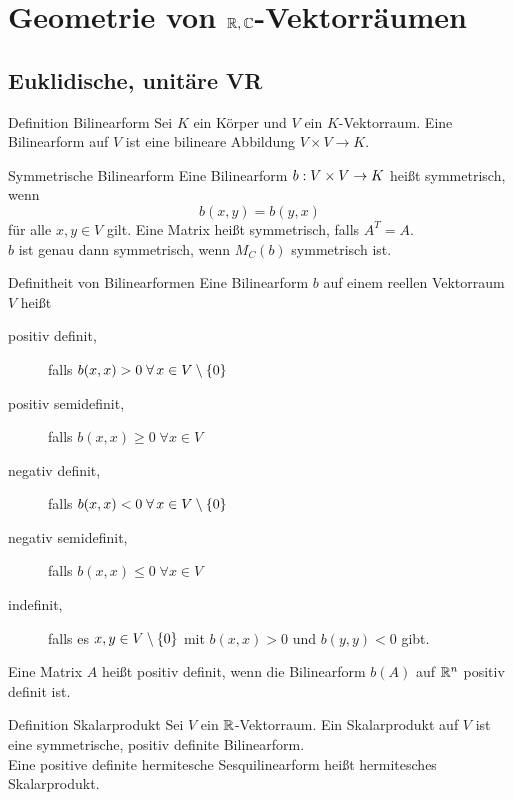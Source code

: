 \documentclass[main.tex]{subfiles}
\begin{document}
\section*{Geometrie von \(\mathbb{R}, \mathbb{C}\)-Vektorräumen}
\subsection*{Euklidische, unitäre VR}

\begin{karte}{Definition Bilinearform}
     Sei \(K\) ein Körper und \(V\) ein \(K\)-Vektorraum. Eine
     Bilinearform auf \(V\) ist eine bilineare Abbildung 
     \(V \times V \rightarrow K\).\\
\end{karte}

\begin{karte}{Symmetrische Bilinearform}
    Eine Bilinearform \(b : V\times V \rightarrow K\) heißt symmetrisch,
    wenn
    \[ b(x,y) = b(y,x) \]
    für alle \(x, y \in V \) gilt. Eine Matrix heißt symmetrisch, 
    falls \(A^T = A\).\\
    \( b \) ist genau dann symmetrisch, wenn \( M_C(b) \) 
    symmetrisch ist.
\end{karte}

\begin{karte}{Definitheit von Bilinearformen}
    Eine Bilinearform \(b\) auf einem reellen Vektorraum \(V\) heißt
    \begin{description}
        \item[positiv definit,] falls \(b(x,x) > 0 \; \forall x \in V \setminus \set{0}\)
        \item[positiv semidefinit,] falls \(b(x,x) \geq 0 \; \forall x \in V\)
        \item[negativ definit,] falls \(b(x,x) < 0 \; \forall x \in V \setminus \set{0}\)
        \item[negativ semidefinit,] falls \(b(x,x) \leq 0 \; \forall x \in V\)
        \item[indefinit,] falls es \(x, y \in V \setminus \{0\}\) mit
        \(b(x,x) > 0\) und \(b(y,y) < 0\) gibt.  
    \end{description}
    Eine Matrix \(A\) heißt positiv definit, wenn
    die Bilinearform \( b(A) \) auf \(\mathbb{R}^n\) 
    positiv definit ist.
\end{karte}

\begin{karte}{Definition Skalarprodukt}
    Sei \(V\) ein \(\mathbb{R}\)-Vektorraum. Ein Skalarprodukt auf \(V\) ist eine
    symmetrische, positiv definite Bilinearform.\\
    Eine positive definite hermitesche Sesquilinearform heißt hermitesches Skalarprodukt.
\end{karte}
\end{document}
